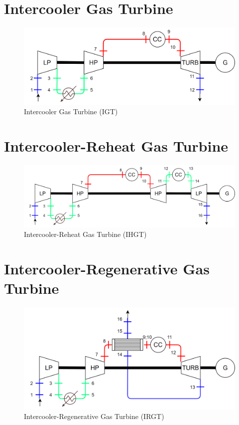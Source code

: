 \section{Intercooler Gas Turbine }
\begin{figure}[H]
    \centering
    \includegraphics[scale=0.15]{Chapitre_5/Images/IGT.png}
    \caption{Intercooler Gas Turbine  (IGT)}
    \label{fig:ann_IGT}
\end{figure}

\section{Intercooler-Reheat Gas Turbine}
\begin{figure}[H]
    \centering
    \includegraphics[scale=0.15]{Chapitre_5/Images/IHGT.png}
    \caption{Intercooler-Reheat Gas Turbine (IHGT)}
    \label{fig:ann_IHGT}
\end{figure}

\section{Intercooler-Regenerative Gas Turbine}
\begin{figure}[H]
    \centering
    \includegraphics[scale=0.15]{Chapitre_5/Images/IRGT.png}
    \caption{Intercooler-Regenerative Gas Turbine (IRGT)}
    \label{fig:ann_IRGT}
\end{figure}


